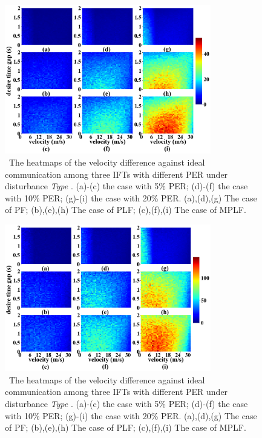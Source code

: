 \documentclass[journal]{IEEEtran}
\begin{document}
\begin{figure}
  \includegraphics[width=9cm]{fig_5.3.1.png}
  \caption{~The heatmaps of the velocity difference against ideal communication among three IFTs with different PER under disturbance \textit{Type \uppercase\expandafter{}}. (a)-(c) the case with 5\% PER; (d)-(f) the case with 10\% PER; (g)-(i) the case with 20\% PER. (a),(d),(g) The case of PF; (b),(e),(h) The case of PLF; (c),(f),(i) The case of MPLF.}
  \label{fig_5.3.1}
\end{figure}
\begin{figure}
  \includegraphics[width=9cm]{fig_5.3.2.png}
  \caption{~The heatmaps of the velocity difference against ideal communication among three IFTs with different PER under disturbance \textit{Type \uppercase\expandafter{}}. (a)-(c) the case with 5\% PER; (d)-(f) the case with 10\% PER; (g)-(i) the case with 20\% PER. (a),(d),(g) The case of PF; (b),(e),(h) The case of PLF; (c),(f),(i) The case of MPLF.}
  \label{fig_5.3.2}
\end{figure}
\end{document}
